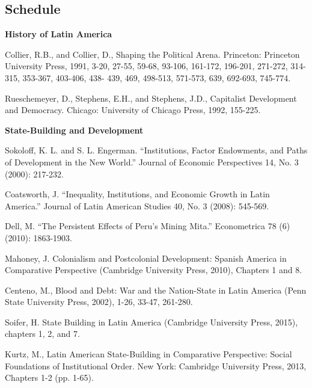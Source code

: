 \documentclass[letterpaper]{article}
\renewenvironment{itemize}{
  \begin{list}{}{
    \setlength{\leftmargin}{1.5em}
  }
}{
  \end{list}
}
\begin{document}
\subsection*{Schedule}

\begin{enumerate}

\item {\bf History of Latin America}
	\begin{itemize}
		\item[$\bullet$] Collier, R.B., and Collier, D., Shaping the Political Arena. Princeton: Princeton University Press, 1991, 3-20, 27-55, 59-68, 93-106, 161-172, 196-201, 271-272, 314-315, 353-367, 403-406, 438- 439, 469, 498-513, 571-573, 639, 692-693, 745-774.
		\item[$\bullet$] Rueschemeyer, D., Stephens, E.H., and Stephens, J.D., Capitalist Development and Democracy. Chicago: University of Chicago Press, 1992, 155-225.
	\end{itemize}



\item {\bf State-Building and Development}
	\begin{itemize}
		\item[$\bullet$] Sokoloff, K. L. and S. L. Engerman. ``Institutions, Factor Endowments, and Paths of Development in the New World.'' Journal of Economic Perspectives 14, No. 3 (2000): 217-232.
		\item[$\bullet$] Coatsworth, J. ``Inequality, Institutions, and Economic Growth in Latin America.'' Journal of Latin American Studies 40, No. 3 (2008): 545-569.
		\item[$\bullet$] Dell, M. ``The Persistent Effects of Peru's Mining Mita.'' Econometrica 78 (6) (2010): 1863-1903.
		\item[$\bullet$] Mahoney, J. Colonialism and Postcolonial Development: Spanish America in Comparative Perspective (Cambridge University Press, 2010), Chapters 1 and 8.
		\item[$\bullet$] Centeno, M., Blood and Debt: War and the Nation-State in Latin America (Penn State University Press, 2002), 1-26, 33-47, 261-280.
		\item[$\bullet$] Soifer, H. State Building in Latin America (Cambridge University Press, 2015), chapters 1, 2, and 7.
		\item[$\bullet$] Kurtz, M., Latin American State-Building in Comparative Perspective: Social Foundations of Institutional Order. New York: Cambridge University Press, 2013, Chapters 1-2 (pp. 1-65).
	\end{itemize}



\end{enumerate}
\end{document}
